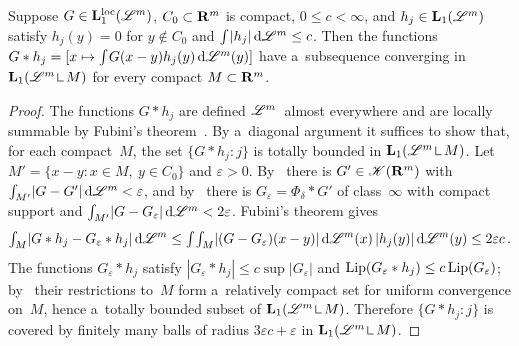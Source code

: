 \documentclass[a4paper,twoside,leqno]{article}
\begin{document}
\begin{lemma}[new]
    \label{new:convcompact}
    Suppose $G \in \mathbf{L}_{1}^{\mathrm{loc}}(\mathscr{L}^m)$, $C_0 \subset \mathbf{R}^m$ is compact, $0 \le c < \infty$, and $h_j \in
    \mathbf{L}_{1}(\mathscr{L}^m)$ satisfy $h_j(y) = 0$ for $y \notin C_0$ and ${\textstyle\int_{}^{}} |h_j| \,\mathrm{d} \mathscr{L}^m \le c$.
    Then the functions $G * h_j = [ x \mapsto {\textstyle\int_{}^{}} G(x - y) h_j(y) \,\mathrm{d} \mathscr{L}^m(y) ]$ have
    a~subsequence converging in $\Lp{1}(\LM^m \restrict M)$ for every compact $M \subset \mathbf{R}^m$.
\end{lemma}

\begin{proof}
    The functions $G * h_j$ are defined $\mathscr{L}^m$~almost everywhere and are locally summable by
    Fubini's theorem~\cite[2.6.2]{Federer1969}. By a~diagonal argument it suffices to show that,
    for each compact~$M$, the set $\{ G * h_j : j \}$ is totally bounded in $\Lp{1}(\LM^m
    \restrict M)$. Let $M' = \{ x - y : x \in M,\ y \in C_0 \}$ and $\varepsilon > 0$.
    By~\cite[2.5.3, 2.5.14]{Federer1969} there is $G' \in \mathscr{K}(\mathbf{R}^m)$ with ${\textstyle\int_{M'}^{}}
    |G - G'| \,\mathrm{d} \mathscr{L}^m < \varepsilon$, and by~\cite[4.1.2]{Federer1969} there is $G_\varepsilon =
    \Phi_\delta * G'$ of class~$\infty$ with compact support and ${\textstyle\int_{M'}^{}} |G -
    G_\varepsilon| \,\mathrm{d} \mathscr{L}^m < 2\varepsilon$. Fubini's theorem gives
    \begin{displaymath}
        {\textstyle\int_{M}^{}} |G * h_j - G_\varepsilon * h_j| \,\mathrm{d} \mathscr{L}^m \le {\textstyle\int_{}^{}} {\textstyle\int_{M}^{}} |(G -
        G_\varepsilon)(x - y)| \,\mathrm{d} \mathscr{L}^m(x) \, |h_j(y)| \,\mathrm{d} \mathscr{L}^m(y) \le 2 \varepsilon c \,.
    \end{displaymath}
    The functions $G_\varepsilon * h_j$ satisfy $|G_\varepsilon * h_j| \le c \sup |G_\varepsilon|$
    and $\operatorname{Lip}(G_\varepsilon * h_j) \le c \operatorname{Lip}(G_\varepsilon)$; by~\cite[2.10.21]{Federer1969} their
    restrictions to~$M$ form a~relatively compact set for uniform convergence on~$M$, hence a~totally
    bounded subset of $\Lp{1}(\LM^m \restrict M)$. Therefore $\{ G * h_j : j \}$ is covered by
    finitely many balls of radius $3 \varepsilon c + \varepsilon$ in $\Lp{1}(\LM^m \restrict M)$.
\end{proof}
\end{document}
